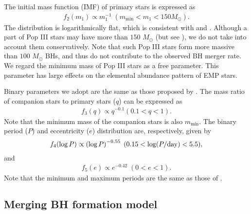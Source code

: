 \documentclass[pdftex]{pasj01}
\newcommand{\msun}{M_\odot}
\newcommand{\msmin}{m_{\min}}
\begin{document}
The initial mass function (IMF) of primary stars is expressed as
\begin{eqnarray}
  f_2(m_1) \propto m_1^{-1} \; (\msmin < m_1 < 150 \msun).
\end{eqnarray}
The distribution is logarithmically flat, which is consistent with
\citet{2014ApJ...792...32S} and \citet{2014ApJ...781...60H}. Although
a part of Pop III stars may have more than $150$ $\msun$ (but see
\cite{2020ApJ...897...58T}), we do not take into account them
conservatively. Note that such Pop III stars form more massive than
$100$ $\msun$ BHs, and thus do not contribute to the observed BH
merger rate. We regard the minimum mass of Pop III stars as a free
parameter. This parameter has large effects on the elemental abundance
pattern of EMP stars.

Binary parameters we adopt are the same as those proposed by
\citet{2012Sci...337..444S}. The mass ratio of companion stars to
primary stars ($q$) can be expressed as
\begin{eqnarray}
  f_3(q) \propto q^{-0.1} (0.1 < q < 1).
\end{eqnarray}
Note that the minimum mass of the companion stars is also
$\msmin$. The binary period ($P$) and eccentricity ($e$) distribution
are, respectively, given by
\begin{eqnarray}
  f_4(\log P) \propto \left( \log P \right)^{-0.55} \; (0.15 <
  \log(P/{\rm day}) < 5.5),
\end{eqnarray}
and
\begin{eqnarray}
  f_5(e) \propto e^{-0.42} \; (0 < e < 1).
\end{eqnarray}
Note that the minimum and maximum periods are the same as those of
\cite{2015ApJ...814...58D}.

\subsection{Merging BH formation model}
\label{sec:BH-BHFormationModel}
\end{document}
